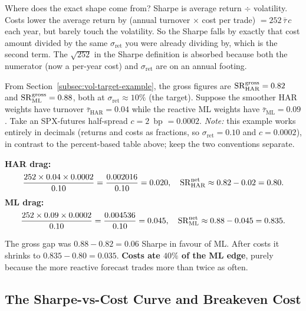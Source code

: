 \begin{intuition}
Where does the exact shape come from? Sharpe is average return $\div$ volatility. Costs lower the average return by (annual turnover $\times$ cost per trade) $= 252\,\bar\tau\,c$ each year, but barely touch the volatility. So the Sharpe falls by exactly that cost amount divided by the same $\sigma_{\text{ret}}$ you were already dividing by, which is the second term. The $\sqrt{252}$ in the Sharpe definition is absorbed because both the numerator (now a per-year cost) and $\sigma_{\text{ret}}$ are on an annual footing.
\end{intuition}

\begin{workedexample}
From Section~\ref{subsec:vol-target-example}, the gross figures are $\operatorname{SR}^{\text{gross}}_{\text{HAR}} = 0.82$ and $\operatorname{SR}^{\text{gross}}_{\text{ML}} = 0.88$, both at $\sigma_{\text{ret}} \approx 10\%$ (the target). Suppose the smoother HAR weights have turnover $\bar\tau_{\text{HAR}} = 0.04$ while the reactive ML weights have $\bar\tau_{\text{ML}} = 0.09$. Take an SPX-futures half-spread $c = 2$~bp $= 0.0002$. \emph{Note:} this example works entirely in decimals (returns and costs as fractions, so $\sigma_{\text{ret}} = 0.10$ and $c = 0.0002$), in contrast to the percent-based table above; keep the two conventions separate.

\medskip
\noindent\textbf{HAR drag:}
\[
\frac{252 \times 0.04 \times 0.0002}{0.10} = \frac{0.002016}{0.10} = 0.020, \quad \operatorname{SR}^{\text{net}}_{\text{HAR}} \approx 0.82 - 0.02 = 0.80.
\]
\noindent\textbf{ML drag:}
\[
\frac{252 \times 0.09 \times 0.0002}{0.10} = \frac{0.004536}{0.10} = 0.045, \quad \operatorname{SR}^{\text{net}}_{\text{ML}} \approx 0.88 - 0.045 = 0.835.
\]

The gross gap was $0.88 - 0.82 = 0.06$ Sharpe in favour of ML. After costs it shrinks to $0.835 - 0.80 = 0.035$. \textbf{Costs ate $40\%$ of the ML edge}, purely because the more reactive forecast trades more than twice as often.
\end{workedexample}

\subsection{The Sharpe-vs-Cost Curve and Breakeven Cost}
\label{subsec:breakeven-cost}

